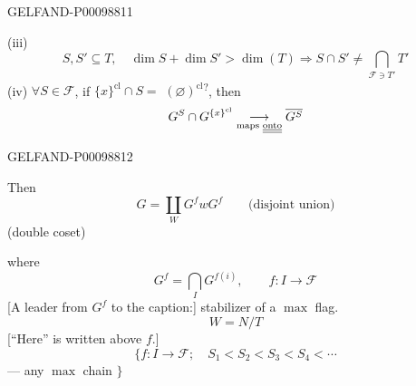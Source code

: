 \begin{GelfandAdjacentEvidence}{GELFAND-P000988}{11}


(iii)
\[
S,S'\subseteq T,\quad\dim S+\dim S'>\dim(T)
\Rightarrow S\cap S'\ne\bigcap_{\mathcal F\ni T'}T'
\]
(iv) $\forall S\in\mathcal F$, if $\{x\}^{\mathrm{cl}}\cap S=$ $(\varnothing)^{\mathrm{cl}}$\textsuperscript{?}, then
\[
G^S\cap G^{\{x\}^{\mathrm{cl}}}
\underset{\text{maps \underline{\underline{onto}}}}{\longrightarrow}
\overline{G^S}
\]
\end{GelfandAdjacentEvidence}
\begin{GelfandAdjacentEvidence}{GELFAND-P000988}{12}

Then
\[
G=\coprod_WG^f wG^f\qquad\text{(disjoint union)}
\]
(double coset)

where
\[
G^f=\bigcap_I G^{f(i)},\qquad f:I\to\mathcal F
\]
[A leader from $G^f$ to the caption:] stabilizer of a $\max$ flag.
\[
W=N/T
\]
[“Here” is written above $f$.]
\[
\{f:I\to\mathcal F;\quad S_1<S_2<S_3<S_4<\cdots
\]
--- any $\max$ chain $\}$ 
\end{GelfandAdjacentEvidence}



